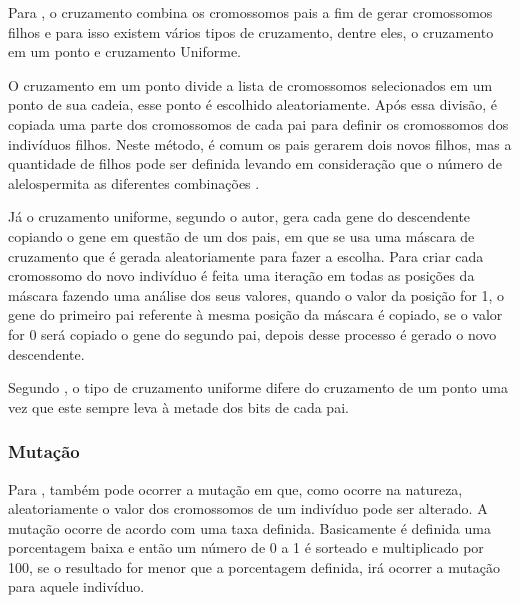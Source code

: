\par Para , o cruzamento combina
os cromossomos pais a fim de gerar cromossomos filhos e para isso existem vários
tipos de cruzamento, dentre eles, o cruzamento em um ponto e cruzamento
Uniforme.

\par O cruzamento em um ponto divide a lista de cromossomos
selecionados em um ponto de sua cadeia, esse ponto é escolhido aleatoriamente.
Após essa divisão, é copiada uma parte dos cromossomos de cada pai para definir
os cromossomos dos indivíduos filhos. Neste método, é comum os pais gerarem dois
novos filhos, mas a quantidade de filhos pode ser definida levando em
consideração que o número de alelos\footnotemark[1] permita as diferentes
combinações \cite{REVISTA_MULTIDISCIPLINAR_DA_UNIESP}.


\par Já o cruzamento uniforme, segundo o autor, gera cada gene do descendente copiando o gene em questão de um dos
pais, em que se usa uma máscara de cruzamento que é gerada aleatoriamente para
fazer a escolha.
Para criar cada cromossomo do novo indivíduo é feita uma iteração em todas as
posições da máscara fazendo uma análise dos seus valores, quando o valor da posição for 1, o gene do
primeiro pai referente à mesma posição da máscara é copiado, se o valor for 0
será copiado o gene do segundo pai, depois desse processo é gerado o novo
descendente.

\par Segundo , o tipo de cruzamento
uniforme difere do cruzamento de um ponto uma vez que este sempre leva à
metade dos bits de cada pai.

\subsubsection{Mutação}

\par Para , também pode ocorrer a mutação em
que, como ocorre na natureza, aleatoriamente o valor dos
cromossomos de um indivíduo pode ser alterado. A mutação ocorre de acordo com
uma taxa definida. Basicamente é definida uma porcentagem baixa e então um
número de 0 a 1 é sorteado e multiplicado por 100, se o resultado for menor que
a porcentagem definida, irá ocorrer a mutação para aquele indivíduo.

